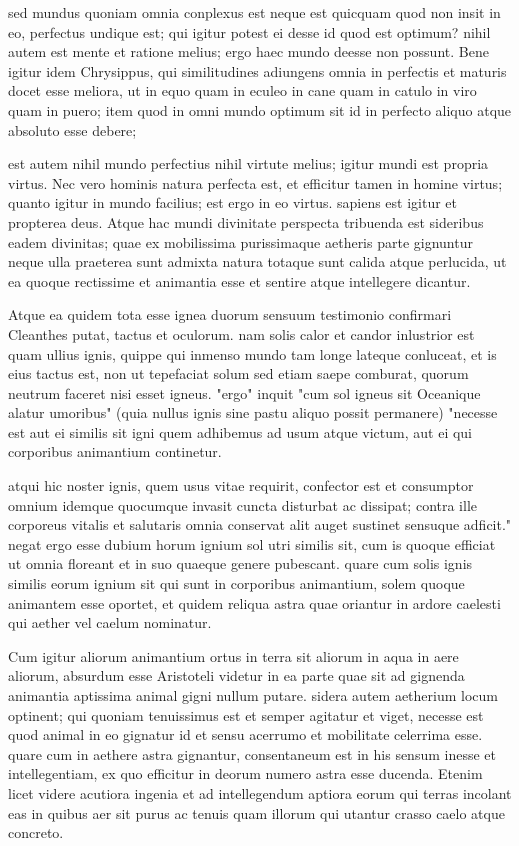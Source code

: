  sed mundus quoniam omnia conplexus est neque est quicquam quod non insit in eo, perfectus undique est; qui igitur potest ei desse id quod est optimum? nihil autem est mente et ratione melius; ergo haec mundo deesse non possunt. Bene igitur idem Chrysippus, qui similitudines adiungens omnia in perfectis et maturis docet esse meliora, ut in equo quam in eculeo in cane quam in catulo in viro quam in puero; item quod in omni mundo optimum sit id in perfecto aliquo atque absoluto esse debere;

 est autem nihil mundo perfectius nihil virtute melius; igitur mundi est propria virtus. Nec vero hominis natura perfecta est, et efficitur tamen in homine virtus; quanto igitur in mundo facilius; est ergo in eo virtus. sapiens est igitur et propterea deus. Atque hac mundi divinitate perspecta tribuenda est sideribus eadem divinitas; quae ex mobilissima purissimaque aetheris parte gignuntur neque ulla praeterea sunt admixta natura totaque sunt calida atque perlucida, ut ea quoque rectissime et animantia esse et sentire atque intellegere dicantur.

 Atque ea quidem tota esse ignea duorum sensuum testimonio confirmari Cleanthes putat, tactus et oculorum. nam solis calor et candor inlustrior est quam ullius ignis, quippe qui inmenso mundo tam longe lateque conluceat, et is eius tactus est, non ut tepefaciat solum sed etiam saepe comburat, quorum neutrum faceret nisi esset igneus. "ergo" inquit "cum sol igneus sit Oceanique alatur umoribus" (quia nullus ignis sine pastu aliquo possit permanere) "necesse est aut ei similis sit igni quem adhibemus ad usum atque victum, aut ei qui corporibus animantium continetur.

 atqui hic noster ignis, quem usus vitae requirit, confector est et consumptor omnium idemque quocumque invasit cuncta disturbat ac dissipat; contra ille corporeus vitalis et salutaris omnia conservat alit auget sustinet sensuque adficit." negat ergo esse dubium horum ignium sol utri similis sit, cum is quoque efficiat ut omnia floreant et in suo quaeque genere pubescant. quare cum solis ignis similis eorum ignium sit qui sunt in corporibus animantium, solem quoque animantem esse oportet, et quidem reliqua astra quae oriantur in ardore caelesti qui aether vel caelum nominatur.

 Cum igitur aliorum animantium ortus in terra sit aliorum in aqua in aere aliorum, absurdum esse Aristoteli videtur in ea parte quae sit ad gignenda animantia aptissima animal gigni nullum putare. sidera autem aetherium locum optinent; qui quoniam tenuissimus est et semper agitatur et viget, necesse est quod animal in eo gignatur id et sensu acerrumo et mobilitate celerrima esse. quare cum in aethere astra gignantur, consentaneum est in his sensum inesse et intellegentiam, ex quo efficitur in deorum numero astra esse ducenda. Etenim licet videre acutiora ingenia et ad intellegendum aptiora eorum qui terras incolant eas in quibus aer sit purus ac tenuis quam illorum qui utantur crasso caelo atque concreto.

